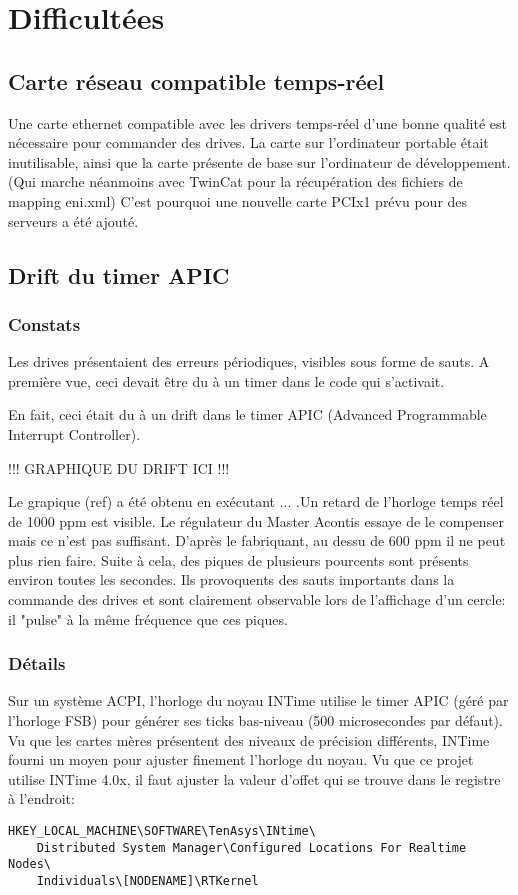 \section{Difficultées}

\subsection{Carte réseau compatible temps-réel}
Une carte ethernet compatible avec les drivers temps-réel d'une bonne qualité est nécessaire pour commander des drives. La carte sur l'ordinateur portable était inutilisable, ainsi que la carte présente de base sur l'ordinateur de développement. (Qui marche néanmoins avec TwinCat pour la récupération des fichiers de mapping eni.xml) C'est pourquoi une nouvelle carte PCIx1 prévu pour des serveurs a été ajouté. 

\subsection{Drift du timer APIC}

\subsubsection{Constats}
Les drives présentaient des erreurs périodiques, visibles sous forme de sauts. A première vue, ceci devait être du à un timer dans le code qui s'activait.

\par
En fait, ceci était du à un drift dans le timer APIC (Advanced Programmable Interrupt Controller).

!!! GRAPHIQUE DU DRIFT ICI !!!

Le grapique (ref) a été obtenu en exécutant ... .Un retard de l'horloge temps réel de 1000 ppm est visible. Le régulateur du Master Acontis  essaye de le compenser mais ce n'est pas suffisant. D'après le fabriquant, au dessu de 600 ppm il ne peut plus rien faire. Suite à cela, des piques de plusieurs pourcents sont présents environ toutes les secondes. Ils provoquents des sauts importants dans la commande des drives et sont clairement observable lors de l'affichage d'un cercle: il "pulse" à la même fréquence que ces piques.

\subsubsection{Détails}

Sur un système ACPI, l'horloge du noyau INTime utilise le timer APIC (géré par l'horloge FSB) pour générer ses ticks bas-niveau (500 microsecondes par défaut). Vu que les cartes mères présentent des niveaux de précision différents, INTime fourni un moyen pour ajuster finement l'horloge du noyau. Vu que ce projet utilise INTime 4.0x, il faut ajuster la valeur d'offet qui se trouve dans le registre à l'endroit:

\begin{lstlisting}[label=reg-path, caption=Chemin vers l'entrée du registre]
	HKEY_LOCAL_MACHINE\SOFTWARE\TenAsys\INtime\
	Distributed System Manager\Configured Locations For Realtime Nodes\
	Individuals\[NODENAME]\RTKernel
\end{lstlisting}